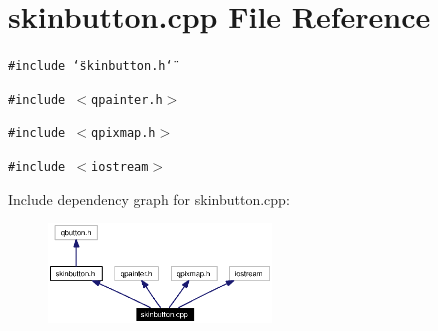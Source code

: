 \section{skinbutton.cpp File Reference}
\label{skinbutton_8cpp}


{\tt \#include \char`\"{}skinbutton.h\char`\"{}}\par
{\tt \#include $<$qpainter.h$>$}\par
{\tt \#include $<$qpixmap.h$>$}\par
{\tt \#include $<$iostream$>$}\par


Include dependency graph for skinbutton.cpp:\begin{figure}[H]
\begin{center}
\leavevmode
\includegraphics[width=168pt]{skinbutton_8cpp__incl}
\end{center}
\end{figure}
